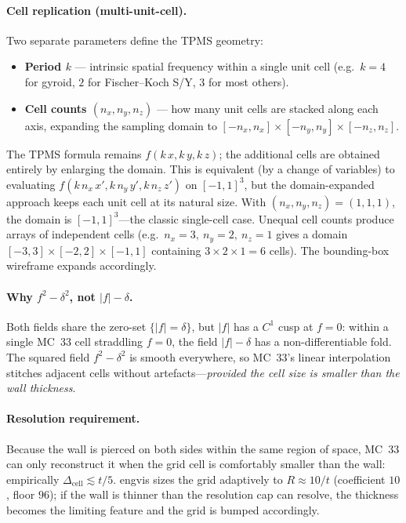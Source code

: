 \documentclass[11pt]{article}
\begin{document}
\paragraph{Cell replication (multi-unit-cell).}\label{sec:cell-replication}
Two separate parameters define the TPMS geometry:
\begin{itemize}[leftmargin=2em]
  \item \textbf{Period $k$} --- intrinsic spatial frequency within a
    single unit cell (e.g.\ $k=4$ for gyroid, $2$ for Fischer--Koch
    S/Y, $3$ for most others).
  \item \textbf{Cell counts $(n_x, n_y, n_z)$} --- how many unit cells
    are stacked along each axis, expanding the sampling domain to
    $[-n_x,n_x]\times[-n_y,n_y]\times[-n_z,n_z]$.
\end{itemize}
The TPMS formula remains $f(k\,x, k\,y, k\,z)$; the additional cells
are obtained entirely by enlarging the domain.  This is equivalent
(by a change of variables) to evaluating $f(k\,n_x\,x', k\,n_y\,y',
k\,n_z\,z')$ on $[-1,1]^3$, but the domain-expanded approach keeps
each unit cell at its natural size.  With $(n_x,n_y,n_z)=(1,1,1)$,
the domain is $[-1,1]^3$---the classic single-cell case.  Unequal cell
counts produce arrays of independent cells (e.g.\ $n_x=3,\ n_y=2,\
n_z=1$ gives a domain $[-3,3]\times[-2,2]\times[-1,1]$ containing
$3\times2\times1=6$ cells).  The bounding-box wireframe expands
accordingly.

\paragraph{Why $f^2-\delta^2$, not $|f|-\delta$.}
Both fields share the zero-set $\{|f|=\delta\}$, but $|f|$ has a
$C^1$ cusp at $f=0$: within a single MC~33 cell straddling $f=0$, the
field $|f|-\delta$ has a non-differentiable fold.  The squared field
$f^2-\delta^2$ is smooth everywhere, so MC~33's linear interpolation
stitches adjacent cells without artefacts---\emph{provided the cell
size is smaller than the wall thickness}.

\paragraph{Resolution requirement.}
Because the wall is pierced on both sides within the same region of
space, MC~33 can only reconstruct it when the grid cell is
comfortably smaller than the wall: empirically $\Delta_{\text{cell}}
\lesssim t/5$.  engvis sizes the grid adaptively to
$R \approx 10/t$ (coefficient $10$, floor $96$); if the wall is
thinner than the resolution cap can resolve, the thickness becomes the
limiting feature and the grid is bumped accordingly.
\end{document}
